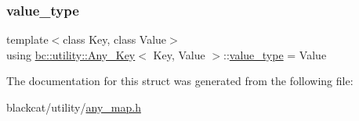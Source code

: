 \subsubsection{\texorpdfstring{value\+\_\+type}{value\_type}}
{\footnotesize\ttfamily template$<$class Key, class Value$>$ \\
using \hyperlink{structbc_1_1utility_1_1Any__Key}{bc\+::utility\+::\+Any\+\_\+\+Key}$<$ Key, Value $>$\+::\hyperlink{structbc_1_1utility_1_1Any__Key_ae37f44db013d6698a17f5c095f32e36b}{value\+\_\+type} =  Value}



The documentation for this struct was generated from the following file\+:\begin{DoxyCompactItemize}
\item 
blackcat/utility/\hyperlink{any__map_8h}{any\+\_\+map.\+h}\end{DoxyCompactItemize}
